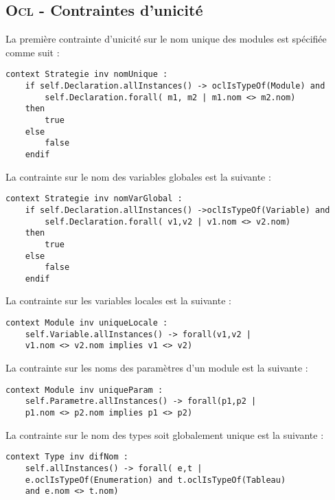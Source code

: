 
\subsection{\textsc{Ocl} - Contraintes d'unicité}
\label{sec:question14}

La première contrainte d'unicité sur le nom unique des modules est spécifiée comme suit :

\begin{lstlisting}[caption=Nom unique au sein d'une stratégie,captionpos=b,label={lst:nom_unique},language=OCL]
context Strategie inv nomUnique :
	if self.Declaration.allInstances() -> oclIsTypeOf(Module) and
		self.Declaration.forall( m1, m2 | m1.nom <> m2.nom)
	then
		true
	else
		false
	endif
\end{lstlisting}

La contrainte sur le nom des variables globales est la suivante :

\begin{lstlisting}[caption=Nom unique d'une variable globale,captionpos=b,label={lst:unique_globale},language=OCL]
context Strategie inv nomVarGlobal :
	if self.Declaration.allInstances() ->oclIsTypeOf(Variable) and
		self.Declaration.forall( v1,v2 | v1.nom <> v2.nom)
	then
		true
	else
		false
	endif
\end{lstlisting}

La contrainte sur les variables locales est la suivante :

\begin{lstlisting}[caption=Nom unique des variables locales,captionpos=b,label={lst:nom_locale},language=OCL]
context Module inv uniqueLocale :
	self.Variable.allInstances() -> forall(v1,v2 | 
	v1.nom <> v2.nom implies v1 <> v2)
\end{lstlisting}

La contrainte sur les noms des paramètres d'un module est la suivante :

\begin{lstlisting}[caption=Nom unique des paramètres,captionpos=b,label={lst:unique_param},language=OCL]
context Module inv uniqueParam :
	self.Parametre.allInstances() -> forall(p1,p2 | 
	p1.nom <> p2.nom implies p1 <> p2)
\end{lstlisting}

La contrainte sur le nom des types soit globalement unique est la suivante :

\begin{lstlisting}[caption=Nom unique des types,captionpos=b,label={lst:type_unique},language=OCL]
context Type inv difNom :
	self.allInstances() -> forall( e,t | 
	e.oclIsTypeOf(Enumeration) and t.oclIsTypeOf(Tableau) 
	and e.nom <> t.nom)
\end{lstlisting}
